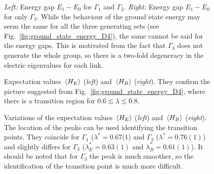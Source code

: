 \vspace*{0.5cm}

\begin{figure}[h]
    \centering
    
    \caption[Ground state gap for $D_4$]{
        \emph{Left:} Energy gap $E_1 - E_0$ for $\Gamma_1$ and $\Gamma_2$.
        \emph{Right:} Energy gap $E_1 - E_0$ for only $\Gamma_3$.
        While the behaviour of the ground state energy may seem the same for all the three generating sets (see Fig.~\ref{fig:ground_state_energy_D4}), the same cannot be said for the energy gaps.
        This is motivated from the fact that $\Gamma_3$ does not generate the whole group, so there is a two-fold degeneracy in the electric eigenvalues for each link.
    }%
    \label{fig:energy_gap_D4}
\end{figure}



\clearpage

\vspace*{1cm}

\begin{figure}[h]
    \centering
    
    \caption[Electric and magnetic energies for $D_4$]{%
        Expectation values $\ev*{H_E}$ (\emph{left}) and $\ev*{H_B}$ (\emph{right}).
        They confirm the picture suggested from Fig.~\ref{fig:ground_state_energy_D4}, where there is a transition region for $ 0.6 \lesssim \lambda \lesssim 0.8$.
    }
    \label{fig:HE_HB_expt_val_D4}
\end{figure}

\vspace*{0.5cm}

\begin{figure}[h]
    \centering
    
    \caption[Electric and magnetic energy variations for $D_4$]{%
        Variations of the expectation values $\ev*{H_E}$ (\emph{left}) and $\ev*{H_B}$ (\emph{right}).
        The location of the peaks can be used identifying the transition points.
        They coincide for $\Gamma_1$ ($\lambda^{\ast} = 0.67(1$) and $\Gamma_2$ ($\lambda^{\ast} = 0.76(1)$) and slightly differs for $\Gamma_3$ ($\lambda_E^{\ast} = 0.63(1)$ and $\lambda_B^{\ast} = 0.61(1)$).
        It should be noted that for $\Gamma_3$ the peak is much smoother, so the identification of the transition point is much more difficult.
    }
    \label{fig:HE_HB_variation_D4}
\end{figure}



